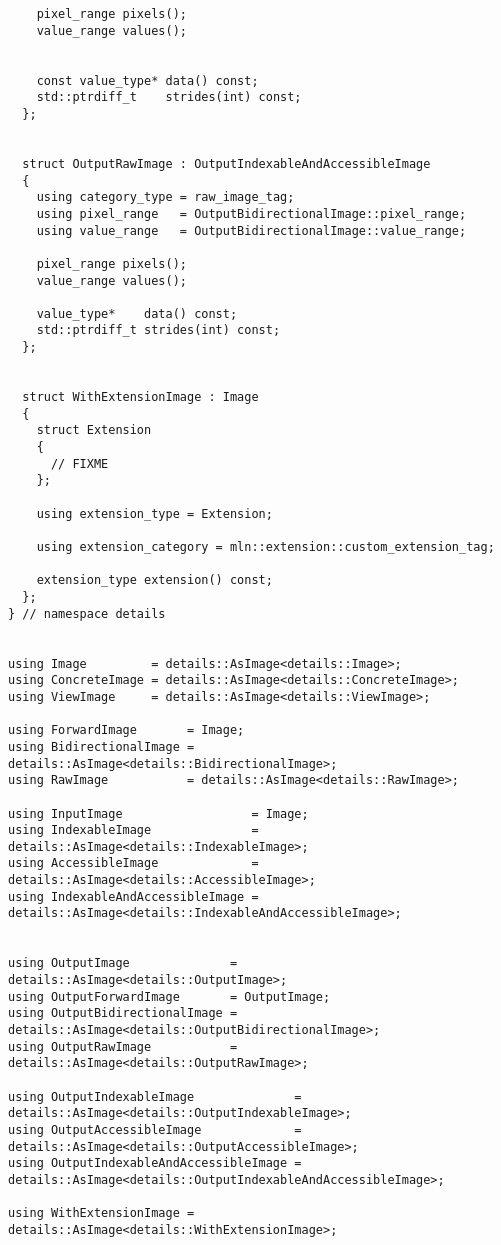 \begin{verbatim}
    pixel_range pixels();
    value_range values();


    const value_type* data() const;
    std::ptrdiff_t    strides(int) const;
  };


  struct OutputRawImage : OutputIndexableAndAccessibleImage
  {
    using category_type = raw_image_tag;
    using pixel_range   = OutputBidirectionalImage::pixel_range;
    using value_range   = OutputBidirectionalImage::value_range;

    pixel_range pixels();
    value_range values();

    value_type*    data() const;
    std::ptrdiff_t strides(int) const;
  };


  struct WithExtensionImage : Image
  {
    struct Extension
    {
      // FIXME
    };

    using extension_type = Extension;

    using extension_category = mln::extension::custom_extension_tag;

    extension_type extension() const;
  };
} // namespace details


using Image         = details::AsImage<details::Image>;
using ConcreteImage = details::AsImage<details::ConcreteImage>;
using ViewImage     = details::AsImage<details::ViewImage>;

using ForwardImage       = Image;
using BidirectionalImage = details::AsImage<details::BidirectionalImage>;
using RawImage           = details::AsImage<details::RawImage>;

using InputImage                  = Image;
using IndexableImage              = details::AsImage<details::IndexableImage>;
using AccessibleImage             = details::AsImage<details::AccessibleImage>;
using IndexableAndAccessibleImage = details::AsImage<details::IndexableAndAccessibleImage>;


using OutputImage              = details::AsImage<details::OutputImage>;
using OutputForwardImage       = OutputImage;
using OutputBidirectionalImage = details::AsImage<details::OutputBidirectionalImage>;
using OutputRawImage           = details::AsImage<details::OutputRawImage>;

using OutputIndexableImage              = details::AsImage<details::OutputIndexableImage>;
using OutputAccessibleImage             = details::AsImage<details::OutputAccessibleImage>;
using OutputIndexableAndAccessibleImage = details::AsImage<details::OutputIndexableAndAccessibleImage>;

using WithExtensionImage = details::AsImage<details::WithExtensionImage>;
\end{verbatim}



